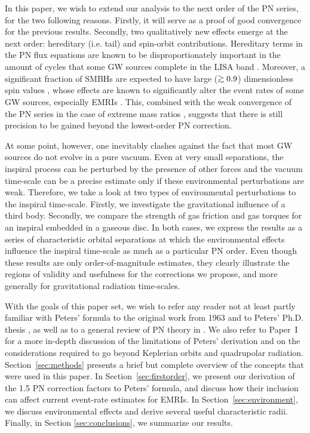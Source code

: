 \documentclass[usenatbib]{mnras}
\def\gsim{\mathrel{\rlap{\lower 3pt \hbox{$\sim$}} \raise 2.0pt \hbox{$>$}}}
\begin{document}
In this paper, we wish to extend our analysis to the next order of the PN series, for the two following reasons. Firstly, it will serve as a proof of good convergence for the previous results. Secondly, two qualitatively new effects emerge at the next order: hereditary (i.e. tail) and spin-orbit contributions. Hereditary terms in the PN flux equations are known to be disproportionately important in the amount of cycles that some GW sources complete in the LISA band \citep[see, e.g.][]{Blanchet2014}. Moreover, a significant fraction of SMBHs are expected to have large ($\gsim 0.9$) dimensionless spin values \citep[see, e.g.][]{Reynolds_2020}, whose effects are known to significantly alter the event rates of some GW sources, especially EMRIs \citep{pau_2013}. This, combined with the weak convergence of the PN series in the case of extreme mass ratios \citep[see, e.g.][]{2008PhRvD..77l4006Y,PhysRevD.84.024029}, suggests that there is still precision to be gained beyond the lowest-order PN correction.

At some point, however, one inevitably clashes against the fact that most GW sources do not evolve in a pure vacuum. Even at very small separations, the inspiral process can be perturbed by the presence of other forces and the vacuum time-scale can be a precise estimate only if these environmental perturbations are weak. Therefore, we take a look at two types of environmental perturbations to the inspiral time-scale. Firstly, we investigate the gravitational influence of a third body. Secondly, we compare the strength of gas friction and gas torques for an inspiral embedded in a gaseous disc. In both cases, we express the results as a series of characteristic orbital separations at which the environmental effects influence the inspiral time-scale as much as a particular PN order. Even though these results are only order-of-magnitude estimates, they clearly illustrate the regions of validity and usefulness for the corrections we propose, and more generally for gravitational radiation time-scales.

With the goals of this paper set, we wish to refer any reader not at least partly familiar with Peters' formula to the original work from 1963 and to Peters' Ph.D. thesis \citep{Peters_Mathews_1963,Peters_1964}, as well as to a general review of PN theory in \cite{Schaefer_rev}. We also refer to Paper~I for a more in-depth discussion of the limitations of Peters' derivation and on the considerations required to go beyond Keplerian orbits and quadrupolar radiation. Section~\ref{sec:methods} presents a brief but complete overview of the concepts that were used in this paper. In Section~\ref{sec:firstorder}, we present our derivation of the 1.5 PN correction factors to Peters' formula, and discuss how their inclusion can affect current event-rate estimates for EMRIs. In Section~\ref{sec:environment}, we discuss environmental effects and derive several useful characteristic radii. Finally, in Section \ref{sec:conclusions}, we summarize our results.
\end{document}
